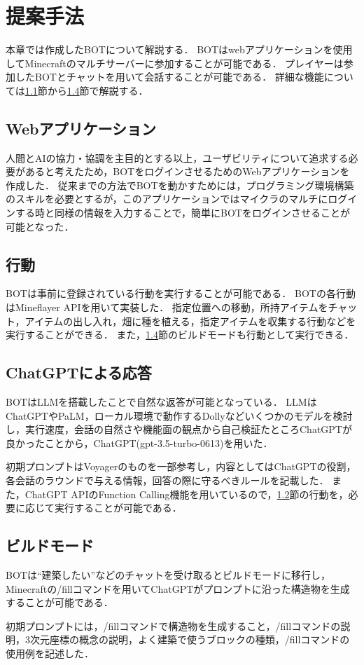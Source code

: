 \chapter{提案手法}	%
\thispagestyle{plain}   %

本章では作成したBOTについて解説する．
BOTはwebアプリケーションを使用してMinecraftのマルチサーバーに参加することが可能である．
プレイヤーは参加したBOTとチャットを用いて会話することが可能である．
詳細な機能については\ref{sec:webapp}節から\ref{sec:build_mode}節で解説する．

\section{Webアプリケーション}\label{sec:webapp}
人間とAIの協力・協調を主目的とする以上，ユーザビリティについて追求する必要があると考えたため，BOTをログインさせるためのWebアプリケーションを作成した．
従来までの方法でBOTを動かすためには，プログラミング環境構築のスキルを必要とするが，このアプリケーションではマイクラのマルチにログインする時と同様の情報を入力することで，簡単にBOTをログインさせることが可能となった．

\section{行動}\label{sec:act}
BOTは事前に登録されている行動を実行することが可能である．
BOTの各行動はMineflayer API\cite{bib:Mineflayer}を用いて実装した．
指定位置への移動，所持アイテムをチャット，アイテムの出し入れ，畑に種を植える，指定アイテムを収集する行動などを実行することができる．
また，\ref{sec:build_mode}節のビルドモードも行動として実行できる．

\section{ChatGPTによる応答}\label{sec:gpt_res}
BOTはLLMを搭載したことで自然な返答が可能となっている．
LLMはChatGPTやPaLM，ローカル環境で動作するDollyなどいくつかのモデルを検討し，実行速度，会話の自然さや機能面の観点から自己検証たところChatGPTが良かったことから，ChatGPT(gpt-3.5-turbo-0613)を用いた．

初期プロンプトはVoyager\cite{bib:Voyager}のものを一部参考し，内容としてはChatGPTの役割，各会話のラウンドで与える情報，回答の際に守るべきルールを記載した．
また，ChatGPT APIのFunction Calling機能を用いているので，\ref{sec:act}節の行動を，必要に応じて実行することが可能である．

\section{ビルドモード}\label{sec:build_mode}
BOTは``建築したい''などのチャットを受け取るとビルドモードに移行し，Minecraftの/fillコマンドを用いてChatGPTがプロンプトに沿った構造物を生成することが可能である．

初期プロンプトには，/fillコマンドで構造物を生成すること，/fillコマンドの説明，3次元座標の概念の説明，よく建築で使うブロックの種類，/fillコマンドの使用例を記述した．
